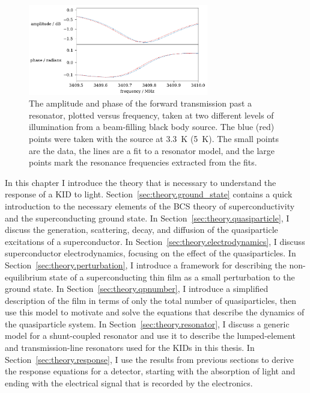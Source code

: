 \begin{figure}[htb]
\centering
\includegraphics[width=0.7\textwidth]{theory/introduction_resonator_amplitude_phase.pdf}
\caption[The amplitude and phase of the forward transmission past a resonator, versus frequency.]
{
The amplitude and phase of the forward transmission past a resonator, plotted versus frequency, taken at two different levels of illumination from a beam-filling black body source.
The blue (red) points were taken with the source at \SI{3.3}{K} (\SI{5}{K}).
The small points are the data, the lines are a fit to a resonator model, and the large points mark the resonance frequencies extracted from the fits.
}
\label{fig:introduction_resonator_amplitude_phase}
\end{figure}

In this chapter I introduce the theory that is necessary to understand the response of a KID to light.
Section~\ref{sec:theory.ground_state} contains a quick introduction to the necessary elements of the BCS theory of superconductivity and the superconducting ground state.
In Section~\ref{sec:theory.quasiparticle}, I discuss the generation, scattering, decay, and diffusion of the quasiparticle excitations of a superconductor.
In Section~\ref{sec:theory.electrodynamics}, I discuss superconductor electrodynamics, focusing on the effect of the quasiparticles.
In Section~\ref{sec:theory.perturbation}, I introduce a framework for describing the non-equilibrium state of a superconducting thin film as a small perturbation to the ground state.
In Section~\ref{sec:theory.qpnumber}, I introduce a simplified description of the film in terms of only the total number of quasiparticles, then use this model to motivate and solve the equations that describe the dynamics of the quasiparticle system.
In Section~\ref{sec:theory.resonator}, I discuss a generic model for a shunt-coupled resonator and use it to describe the lumped-element and transmission-line resonators used for the KIDs in this thesis.
In Section~\ref{sec:theory.response}, I use the results from previous sections to derive the response equations for a detector, starting with the absorption of light and ending with the electrical signal that is recorded by the electronics.








